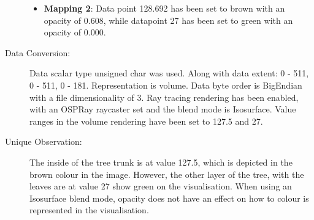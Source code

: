 \begin{description}
	\begin{itemize}
		\tightlist
		\item
		\textbf{Mapping 2}:
		\hfill \break 
		Data point 128.692 has been set to brown with an opacity of 0.608, while datapoint 27 has been set to green with an opacity of 0.000.
	\end{itemize}
	\item[Data Conversion:] 
	\hfill \break 
	Data scalar type unsigned char was used. Along with data extent: 0 - 511, 0 - 511, 0 - 181. Representation is volume. Data byte order is BigEndian with a file dimensionality of 3. Ray tracing rendering has been enabled, with an OSPRay raycaster set and the blend mode is Isosurface. Value ranges in the volume rendering have been set to 127.5 and 27.
	\item[Unique Observation:]
	\hfill \break 
	The inside of the tree trunk is at value 127.5, which is depicted in the brown colour in the image. However, the other layer of the tree, with the leaves are at value 27 show green on the visualisation. When using an Isosurface blend mode, opacity does not have an effect on how to colour is represented in the visualisation.
	
	
\end{description}
